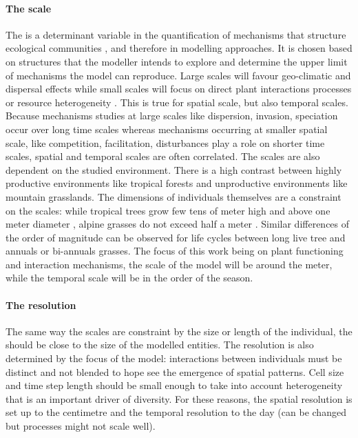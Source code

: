 \paragraph{The scale}
The  is a determinant variable in the quantification of mechanisms that structure ecological communities \cite{bello_hierarchical_2013}, and therefore in modelling approaches. It is chosen based on structures that the modeller intends to explore and determine the upper limit of mechanisms the model can reproduce. Large scales will favour geo-climatic and dispersal effects \cite{kleidon_global_2000} while small scales will focus on direct plant interactions processes or resource heterogeneity \cite{ soussana_gemini:_2012, maire_plasticity_2013, taubert_modelling_2014}. This is true for spatial scale, but also temporal scales. Because mechanisms studies at large scales like dispersion, invasion, speciation occur over long time scales whereas mechanisms occurring at smaller spatial scale, like competition, facilitation, disturbances play a role on shorter time scales, spatial and temporal scales are often correlated. The scales are also dependent on the studied environment. There is a high contrast between highly productive environments like tropical forests and unproductive environments like mountain grasslands. The dimensions of individuals themselves are a constraint on the scales: while tropical trees grow few tens of meter high and above one meter diameter \cite{}, alpine grasses do not exceed half a meter \cite{korner_alpine_2011}. Similar differences of the order of magnitude can be observed for life cycles between long live tree and annuals or bi-annuals grasses. The focus of this work being on plant functioning and interaction mechanisms, the scale of the model will be around the meter, while the temporal scale will be in the order of the season.

\paragraph{The resolution} The same way the scales are constraint by the size or length of the individual, the  should be close to the size of the modelled entities. The resolution is also determined by the focus of the model: interactions between individuals must be distinct and not blended to hope see the emergence of spatial patterns. Cell size and time step length should be small enough to take into account heterogeneity that is an important driver of diversity. For these reasons, the spatial resolution is set up to the centimetre and the temporal resolution to the day (can be changed but processes might not scale well).

